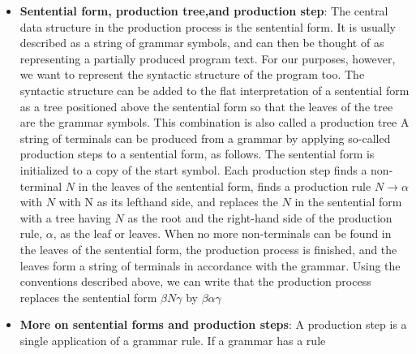 \documentclass{report}
\begin{document}
\begin{itemize}
            \begin{itemize}
                \item \textbf{Non-terminals} are denoted by capital letters, mostly $A$, $B$, $C$, and $N$.
                \item \textbf{Terminals} are denoted by lower-case letters near the end of the alphabet, mostly $x$, $y$, and $z$.
                \item \textbf{Sequences of grammar symbols} are denoted by Greek letters near the beginning of the alphabet, mostly $\alpha$ (alpha), $\beta$ (beta), and $\gamma$ (gamma).
                \item \textbf{Lower-case letters near the beginning of the alphabet} ($a$, $b$, $c$, etc.) stand for themselves, as terminals.
                \item \textbf{The empty sequence} is denoted by $\varepsilon$ (epsilon).
            \end{itemize}
        \item \textbf{Sentential form, production tree,and production step}: The central data structure in the production process is the sentential form. It is usually described as a string of grammar symbols, and can then be thought of as representing a partially produced program text. For our purposes, however, we want to represent the syntactic structure of the program too. The syntactic structure can be added to the flat interpretation of a sentential form as a tree positioned above the sentential form so that the leaves of the tree are the grammar symbols. This combination is also called a production tree
            \bigbreak \noindent 
            A string of terminals can be produced from a grammar by applying so-called production steps to a sentential form, as follows. The sentential form is initialized to a copy of the start symbol. Each production step finds a non-terminal $N$ in the leaves of the sentential form, finds a production rule $N \to \alpha$ with $N$ with N as its lefthand side, and replaces the $N$ in the sentential form with a tree having $N$ as the root and the right-hand side of the production rule, $\alpha$, as the leaf or leaves. When no more non-terminals can be found in the leaves of the sentential form, the production process is finished, and the leaves form a string of terminals in accordance with the grammar.
            \bigbreak \noindent 
            Using the conventions described above, we can write that the production process replaces the sentential form $\beta N \gamma$ by $ \beta \alpha \gamma $
        \item \textbf{More on sentential forms and production steps}: A production step is a single application of a grammar rule. If a grammar has a rule

\end{itemize}
\end{document}
